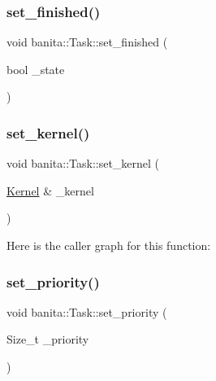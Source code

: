 \mbox{\label{classbanita_1_1_task_a3727f04d5ac8dcdf3ff41cc0609139e0}} 
\subsubsection{\texorpdfstring{set\_finished()}{set\_finished()}}
{\footnotesize\ttfamily void banita\+::\+Task\+::set\+\_\+finished (\begin{DoxyParamCaption}\item[{bool}]{\+\_\+state }\end{DoxyParamCaption})\hspace{0.3cm}{\ttfamily [inline]}}

\mbox{\label{classbanita_1_1_task_a2f8babba8f085c5a65b58eaf2f73c121}} 
\subsubsection{\texorpdfstring{set\_kernel()}{set\_kernel()}}
{\footnotesize\ttfamily void banita\+::\+Task\+::set\+\_\+kernel (\begin{DoxyParamCaption}\item[{\mbox{\hyperlink{classbanita_1_1_kernel}{Kernel}} \&}]{\+\_\+kernel }\end{DoxyParamCaption})\hspace{0.3cm}{\ttfamily [inline]}}

Here is the caller graph for this function\+:
\mbox{\label{classbanita_1_1_task_a254be860b0f3f3c687b8f52e090de228}} 
\subsubsection{\texorpdfstring{set\_priority()}{set\_priority()}}
{\footnotesize\ttfamily void banita\+::\+Task\+::set\+\_\+priority (\begin{DoxyParamCaption}\item[{Size\+\_\+t}]{\+\_\+priority }\end{DoxyParamCaption})\hspace{0.3cm}{\ttfamily [inline]}}

